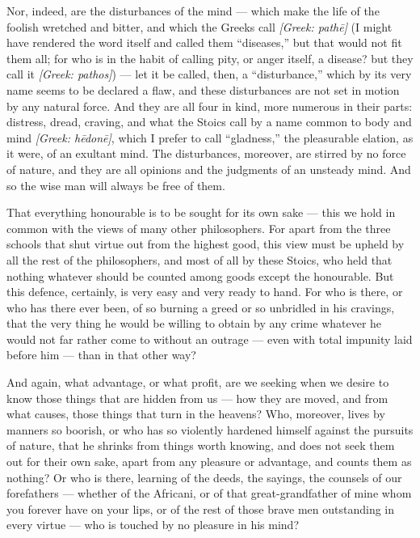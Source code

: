  Nor, indeed, are the disturbances of the mind — which make the life of the foolish wretched and bitter, and which the Greeks call \textit{[Greek: pathē]} (I might have rendered the word itself and called them ``diseases,'' but that would not fit them all; for who is in the habit of calling pity, or anger itself, a disease? but they call it \textit{[Greek: pathos]}) — let it be called, then, a ``disturbance,'' which by its very name seems to be declared a flaw, and these disturbances are not set in motion by any natural force. And they are all four in kind, more numerous in their parts: distress, dread, craving, and what the Stoics call by a name common to body and mind \textit{[Greek: hēdonē]}, which I prefer to call ``gladness,'' the pleasurable elation, as it were, of an exultant mind. The disturbances, moreover, are stirred by no force of nature, and they are all opinions and the judgments of an unsteady mind. And so the wise man will always be free of them.

 That everything honourable is to be sought for its own sake — this we hold in common with the views of many other philosophers. For apart from the three schools that shut virtue out from the highest good, this view must be upheld by all the rest of the philosophers, and most of all by these Stoics, who held that nothing whatever should be counted among goods except the honourable. But this defence, certainly, is very easy and very ready to hand. For who is there, or who has there ever been, of so burning a greed or so unbridled in his cravings, that the very thing he would be willing to obtain by any crime whatever he would not far rather come to without an outrage — even with total impunity laid before him — than in that other way?

 And again, what advantage, or what profit, are we seeking when we desire to know those things that are hidden from us — how they are moved, and from what causes, those things that turn in the heavens? Who, moreover, lives by manners so boorish, or who has so violently hardened himself against the pursuits of nature, that he shrinks from things worth knowing, and does not seek them out for their own sake, apart from any pleasure or advantage, and counts them as nothing? Or who is there, learning of the deeds, the sayings, the counsels of our forefathers — whether of the Africani, or of that great-grandfather of mine whom you forever have on your lips, or of the rest of those brave men outstanding in every virtue — who is touched by no pleasure in his mind?

